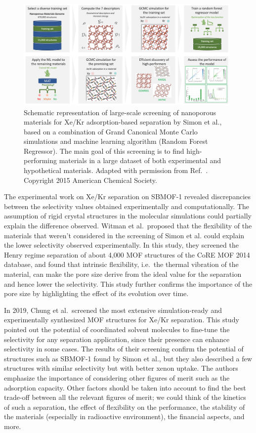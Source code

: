 \documentclass[main.tex]{subfiles}
\begin{document}
\begin{figure}[t]
  \centering
  \includegraphics[width=0.98\textwidth]{figures/1-screening/Simon.jpg}
  \caption{Schematic representation of large-scale screening of nanoporous materials for Xe/Kr adsorption-based separation by Simon et al.,\cite{Simon_2015} based on a combination of Grand Canonical Monte Carlo simulations and machine learning algorithm (Random Forest Regressor). The main goal of this screening is to find high-performing materials in a large dataset of both experimental and hypothetical materials. 
  Adapted with permission from Ref.~. Copyright 2015 American Chemical Society.
  }\label{fgr:Simon}
\end{figure}

The experimental work on Xe/Kr separation on SBMOF-1 revealed discrepancies between the selectivity values obtained experimentally and computationally.\cite{Banerjee_2016} {The assumption of rigid crystal structures in the molecular simulations could partially explain the difference observed.} Witman et al.\ proposed that the flexibility of the materials that weren't considered in the screening of Simon et al. could explain the lower selectivity observed experimentally.\cite{Witman_2017} In this study, they screened the Henry regime separation of about 4,000 MOF structures of the CoRE MOF 2014 database\cite{Chung_2014}, and found that intrinsic flexibility, i.e.\ the thermal vibration of the material, can make the pore size derive from the ideal value for the separation and hence lower the selectivity. This study further confirms the importance of the pore size by highlighting the effect of its evolution over time.

In 2019, Chung et al.\ screened the most extensive simulation-ready and experimentally synthesized MOF structures for Xe/Kr separation.\cite{Chung_2019} This study pointed out the potential of coordinated solvent molecules to fine-tune the selectivity for any separation application, since their presence can enhance selectivity in some cases. The results of their screening confirm the potential of structures such as SBMOF-1 found by Simon et al., but they also described a few structures with similar selectivity but with better xenon uptake. The authors emphasize the importance of considering other figures of merit such as the adsorption capacity. Other factors should be taken into account to find the best trade-off between all the relevant figures of merit; we could think of the kinetics of such a separation, the effect of flexibility on the performance, the stability of the materials (especially in radioactive environment), the financial aspects, and more.
\end{document}
